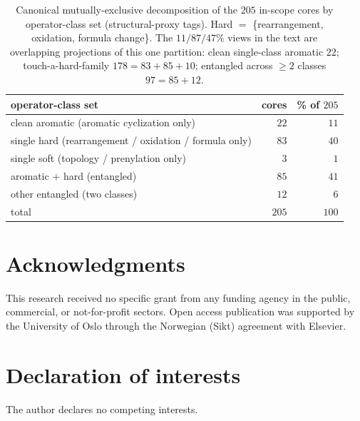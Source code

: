 \documentclass[11pt]{article}
\theoremstyle{definition}
\begin{document}
\begin{table}[h]\centering\small
\begin{tabular}{lrr}
\toprule
operator-class set & cores & \% of $205$ \\
\midrule
clean aromatic (aromatic cyclization only)              & $22$  & $11$ \\
single hard (rearrangement / oxidation / formula only)  & $83$  & $40$ \\
single soft (topology / prenylation only)               & $3$   & $1$  \\
aromatic $+$ hard (entangled)                           & $85$  & $41$ \\
other entangled (two classes)                           & $12$  & $6$  \\
\midrule
total                                                   & $205$ & $100$ \\
\bottomrule
\end{tabular}
\caption{Canonical mutually-exclusive decomposition of the $205$ in-scope cores by operator-class set
(structural-proxy tags). Hard $=$ \{rearrangement, oxidation, formula change\}. The $11/87/47\%$ views in
the text are overlapping projections of this one partition: clean single-class aromatic $22$;
touch-a-hard-family $178=83+85+10$; entangled across $\ge2$ classes $97=85+12$.}
\label{app:tab:mece}
\end{table}

\section*{Acknowledgments}
This research received no specific grant from any funding agency in the public, commercial, or
not-for-profit sectors. Open access publication was supported by the University of Oslo through the
Norwegian (Sikt) agreement with Elsevier.

\section*{Declaration of interests}
The author declares no competing interests.
\end{document}
